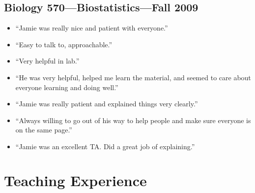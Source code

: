 \documentclass[10pt]{article}
\newenvironment{myItemize}{
  \begin{itemize}
    \setlength{\leftskip}{-4mm}
    \setlength{\itemsep}{0.25em}
    \setlength{\parskip}{0pt}
    \setlength{\parsep}{0.5em}}
  {\end{itemize}}
\begin{document}
\subsection*{Biology 570---Biostatistics---Fall 2009}
\begin{myItemize}
\sffamily
\item ``Jamie was really nice and patient with everyone.''
\item ``Easy to talk to, approachable.''
\item ``Very helpful in lab.''
\item ``He was very helpful, helped me learn the material, and seemed to care
about everyone learning and doing well.''
\item ``Jamie was really patient and explained things very clearly.''
\item ``Always willing to go out of his way to help people and make sure
everyone is on the same page.''
\item ``Jamie was an excellent TA. Did a great job of explaining.''
\end{myItemize}

\section*{Teaching Experience}
\end{document}
